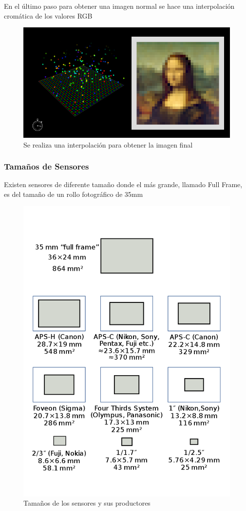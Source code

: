 \documentclass{article}
\begin{document}
En el último paso para obtener una imagen normal se hace una interpolación cromática de los valores RGB

\begin{figure}[H]
	\centering
	\includegraphics[width=0.65\linewidth]{Figuras/Sensor_Bayer_Demosaico}
	\caption{Se realiza una interpolación para obtener la imagen final}
	\label{fig:sensorbayerdemosaico}
\end{figure}

\subsubsection{Tamaños de Sensores}

Existen sensores de diferente tamaño donde el más grande, llamado Full Frame, es del tamaño de un rollo fotográfico de 35mm

\begin{figure}[H]
	\centering
	\includegraphics[width=0.65\linewidth]{Figuras/Sensor_Sizes_Standalone}
	\caption{Tamaños de los sensores y sus productores}
	\label{fig:sensorsizesstandalone}
\end{figure}
\end{document}
